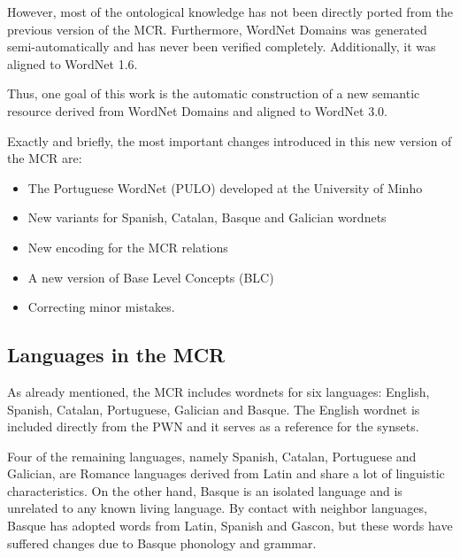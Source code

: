 \documentclass[runningheads]{llncs}
\begin{document}
However, most of the ontological knowledge has not been directly ported from the previous version of the MCR. Furthermore, WordNet Domains was generated semi-automatically and has never been verified completely. Additionally, it was aligned to WordNet 1.6. 

Thus, one goal of this work is the automatic construction of a new semantic resource derived from WordNet Domains and aligned to WordNet 3.0.

Exactly and briefly, the most important  changes introduced in this  new version of the MCR are: 

\begin{itemize}
\item The  Portuguese  WordNet  (PULO) developed  at the University of Minho  %

\item New  variants  for  Spanish,  Catalan,  Basque  and  Galician wordnets

\item New encoding for the MCR relations 

\item  A new version of Base Level Concepts (BLC)

\item  Correcting minor mistakes. %
\end{itemize}


\subsection{Languages in the MCR}

As already mentioned, the MCR includes wordnets for six languages: English, Spanish, Catalan, Portuguese, Galician and Basque. The English wordnet is included directly from the PWN and it serves as a reference for the synsets.

Four of the remaining languages, namely Spanish, Catalan, Portuguese and Galician, are Romance languages derived from Latin and share a lot of linguistic characteristics. On the other hand, Basque is an isolated language and is unrelated to any known living language. By contact with neighbor languages, Basque has adopted words from Latin, Spanish and Gascon, but these words have suffered changes due to Basque phonology and grammar.
\end{document}
